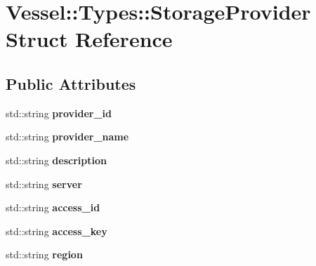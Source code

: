 \hypertarget{struct_vessel_1_1_types_1_1_storage_provider}{}\section{Vessel\+:\+:Types\+:\+:Storage\+Provider Struct Reference}
\label{struct_vessel_1_1_types_1_1_storage_provider}
\subsection*{Public Attributes}
\begin{DoxyCompactItemize}
\item 
\mbox{\label{struct_vessel_1_1_types_1_1_storage_provider_a962cfc115daa3f6e963fb7e72b55c454}} 
std\+::string {\bfseries provider\+\_\+id}
\item 
\mbox{\label{struct_vessel_1_1_types_1_1_storage_provider_a065fa63ae96ee48405e8b74684578b64}} 
std\+::string {\bfseries provider\+\_\+name}
\item 
\mbox{\label{struct_vessel_1_1_types_1_1_storage_provider_ab8e1ef210e27d2667d0454a6b4e7127e}} 
std\+::string {\bfseries description}
\item 
\mbox{\label{struct_vessel_1_1_types_1_1_storage_provider_a6357453e0f626759a9230c800ddec3e4}} 
std\+::string {\bfseries server}
\item 
\mbox{\label{struct_vessel_1_1_types_1_1_storage_provider_ad30e41a94fbac78cc1fdfd9c46ca7fcc}} 
std\+::string {\bfseries access\+\_\+id}
\item 
\mbox{\label{struct_vessel_1_1_types_1_1_storage_provider_a3363c79613348bf1a6c2bd562c476181}} 
std\+::string {\bfseries access\+\_\+key}
\item 
\mbox{\label{struct_vessel_1_1_types_1_1_storage_provider_af482e204357e832d7a3c4959543fcef7}} 
std\+::string {\bfseries region}

\end{DoxyCompactItemize}
